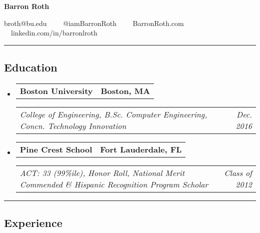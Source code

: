 \documentclass[10pt,letterpaper]{article}
\makeatletter
\newcommand{\headerrow}[2]
{\begin{tabular*}{\linewidth}{l@{\extracolsep{\fill}}r}
	#1 &
	#2 \\
\end{tabular*}}
\makeatother
\begin{document}
\begin{center}
{\LARGE \textbf{Barron Roth}}

broth@bu.edu\ \ \textbullet
\ \ @iamBarronRoth\ \ \textbullet
\ \ BarronRoth.com\ \ \textbullet
\ \ linkedin.com/in/barronlroth

\end{center}

\hrule
\vspace{-0.9em}

\subsection*{Education}

\begin{itemize}
	\parskip=0.001em
	
	\item 
	\headerrow
	{\textbf{Boston University}}
	{\textbf{Boston, MA}}
	\headerrow
	{\emph{College of Engineering, B.Sc. Computer Engineering, Concn. Technology Innovation}}
	{\emph{Dec. 2016}}
	
	\item 
	\headerrow
	{\textbf{Pine Crest School}}
	{\textbf{Fort Lauderdale, FL}}
	\headerrow
	{\emph{ACT: 33 (99\%ile), Honor Roll, National Merit Commended \& Hispanic Recognition Program Scholar}}
	{\emph{Class of 2012}}
	
\end{itemize}


\hrule
\vspace{-0.9em}


\subsection*{Experience}
\end{document}
